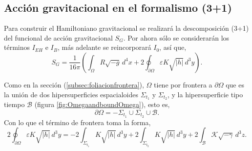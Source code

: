 
\subsection{Acci\'{o}n gravitacional en el formalismo (3+1)}

Para construir el Hamiltoniano gravitacional se realizar\'{a} la descomposici\'{o}n (3+1) del funcional de acci\'{o}n gravitacional $S_{G}$. Por ahora s\'{o}lo se considerar\'{a}n los t\'{e}rminos $I_{EH}$ e $I_{B}$, m\'{a}s adelante se reincorporar\'{a} $I_{0}$, as\'{i} que,
%
\begin{equation}
\label{eq:SGIEHIB}
S_{G} = \frac{1}{16 \pi} \left( \int_{\Omega} R \sqrt{-g} \, d^{4} x + 2 \oint_{\partial \Omega} \varepsilon K \sqrt{|h|} \, d^{3} y \right).
\end{equation}

Como en la secci\'{o}n (\ref{subsec:foliacionfrontera}), $\Omega$ tiene por frontera a $\partial \Omega$ que es la uni\'{o}n de dos hipersuperficies espacialoides $\Sigma_{t_{1}}$ y $\Sigma_{t_{2}}$, y la hipersuperficie tipo tiempo $\mathcal{B}$ (figura \ref{fig:OmegaandboundOmega}), esto es,
%
\begin{equation}
\label{eq:domegaU}
\partial \Omega  = -\Sigma_{t_{1}} \cup \Sigma_{t_{2}} \cup \mathcal{B}.
\end{equation}
%
Con lo que el t\'{e}rmino de frontera toma la forma,
%
\begin{equation}
\label{eq:IB31}
2 \oint_{\partial \Omega} \varepsilon K \sqrt{|h|} \, d^{3} y = - 2 \int_{\Sigma_{t_1}} K \sqrt{|h|} \, d^{3} y + 2 \int_{\Sigma_{t_2}} K \sqrt{|h|} \, d^{3} y + 2 \int_{\mathcal{B}} \mathcal{K} \sqrt{-\gamma} \, d^{3} z.
\end{equation}

